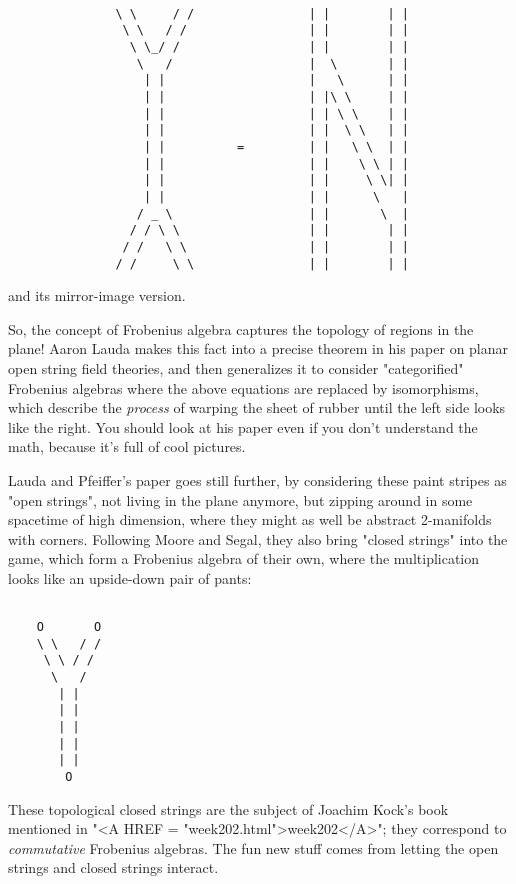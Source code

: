 \begin{verbatim}

               \ \     / /                | |        | |
                \ \   / /                 | |        | |
                 \ \_/ /                  | |        | |
                  \   /                   |  \       | |
                   | |                    |   \      | |
                   | |                    | |\ \     | |   
                   | |                    | | \ \    | |
                   | |                    | |  \ \   | |
                   | |          =         | |   \ \  | |
                   | |                    | |    \ \ | |
                   | |                    | |     \ \| |
                   | |                    | |      \   |
                  / _ \                   | |       \  |
                 / / \ \                  | |        | |
                / /   \ \                 | |        | | 
               / /     \ \                | |        | |
\end{verbatim}
    
and its mirror-image version. 

So, the concept of Frobenius algebra captures the topology of regions
in the plane!  Aaron Lauda makes this fact into a precise theorem in
his paper on planar open string field theories, and then generalizes
it to consider "categorified" Frobenius algebras where the
above equations are replaced by isomorphisms, which describe the
\emph{process} of warping the sheet of rubber until the left side looks
like the right.  You should look at his paper even if you don't
understand the math, because it's full of cool pictures.

Lauda and Pfeiffer's paper goes still further, by considering these
paint stripes as "open strings", not living in the plane
anymore, but zipping around in some spacetime of high dimension, where
they might as well be abstract 2-manifolds with corners.  Following
Moore and Segal, they also bring "closed strings" into the
game, which form a Frobenius algebra of their own, where the
multiplication looks like an upside-down pair of pants:


\begin{verbatim}

    O       O
    \ \   / /
     \ \ / /
      \   /
       | |
       | |
       | | 
       | |
       | |
        O
\end{verbatim}
    
These topological closed strings are the subject of Joachim Kock's
book mentioned in "<A HREF = "week202.html">week202</A>";
they correspond to \emph{commutative} Frobenius algebras.  The fun new
stuff comes from letting the open strings and closed strings interact.

